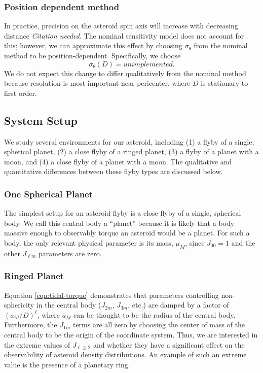 \documentclass{aastex631}
\newcommand{\jtd}[1]{{\color{red}\textit{#1}}}
\begin{document}
\subsubsection{Position dependent method}
In practice, precision on the asteroid spin axis will increase with decreasing distance \jtd{Citation needed}. The nominal sensitivity model does not account for this; however, we can approximate this effect by choosing $\sigma_\theta$ from the nominal method to be position-dependent. Specifically, we choose
\begin{equation}
\sigma_\theta(D) = unimplemented.
\label{eqn:pos-dependent-sensitivity}
\end{equation}
We do not expect this change to differ qualitatively from the nominal method because resolution is most important near pericenter, where $D$ is stationary to first order.



\subsection{System Setup}
We study several environments for our asteroid, including (1) a flyby of a single, spherical planet, (2) a close flyby of a ringed planet, (3) a flyby of a planet with a moon, and (4) a close flyby of a planet with a moon. The qualitative and quantitative differences between these flyby types are discussed below.

\subsubsection{One Spherical Planet}
The simplest setup for an asteroid flyby is a close flyby of a single, spherical body. We call this central body a ``planet'' because it is likely that a body massive enough to observably torque an asteroid would be a planet. For such a body, the only relevant physical parameter is its mass, $\mu_M$, since $J_{00} = 1$ and the other $J_{\ell m}$ parameters are zero.

\subsubsection{Ringed Planet}
Equation \ref{eqn:tidal-torque} demonstrates that parameters controlling non-sphericity in the central body ($J_{2m}$, $J_{3m}$, etc.) are damped by a factor of $(a_M/D)^\ell$, where $a_M$ can be thought to be the radius of the central body. Furthermore, the $J_{1m}$ terms are all zero by choosing the center of mass of the central body to be the origin of the coordinate system. Thus, we are interested in the extreme values of $J_{\ell \geq 2}$ and whether they have a significant effect on the observability of asteroid density distributions. An example of such an extreme value is the presence of a planetary ring.
\end{document}
